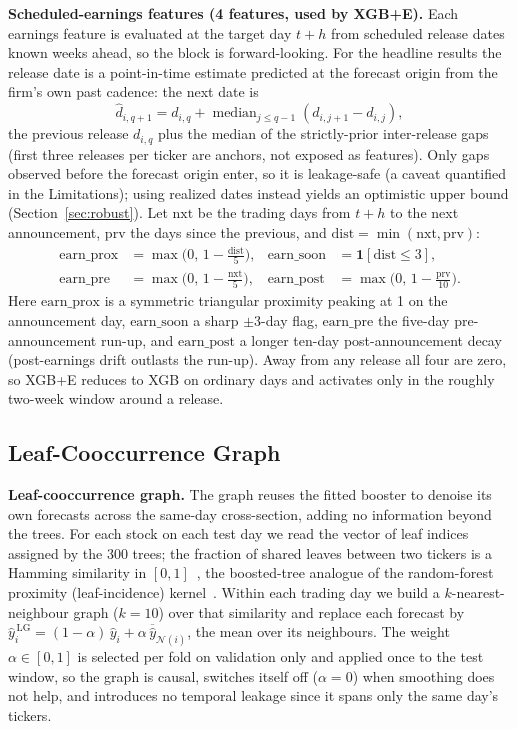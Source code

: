 \documentclass[runningheads]{llncs}
\begin{document}
\textbf{Scheduled-earnings features (4 features, used by XGB+E).} Each earnings feature is evaluated at the
target day $t+h$ from scheduled release dates known weeks ahead, so the block is forward-looking. For the
headline results the release date is a point-in-time estimate predicted at the forecast origin from the
firm's own past cadence: the next date is
\[ \hat d_{i,q+1} = d_{i,q} + \operatorname{median}_{j\le q-1}\left(d_{i,j+1}-d_{i,j}\right), \]
the previous release $d_{i,q}$ plus the median of the strictly-prior inter-release gaps (first three
releases per ticker are anchors, not exposed as features). Only gaps observed before the forecast origin
enter, so it is leakage-safe (a caveat quantified in the Limitations); using realized dates instead yields
an optimistic upper bound (Section~\ref{sec:robust}). Let $\mathrm{nxt}$ be the trading days from $t+h$ to
the next announcement, $\mathrm{prv}$ the days since the previous, and
$\mathrm{dist}=\min(\mathrm{nxt},\mathrm{prv})$:
\begin{align}
\mathrm{earn\_prox} &= \max\!\Big(0,\,1-\tfrac{\mathrm{dist}}{5}\Big), &
\mathrm{earn\_soon} &= \mathbf{1}[\mathrm{dist}\le 3],\\
\mathrm{earn\_pre} &= \max\!\Big(0,\,1-\tfrac{\mathrm{nxt}}{5}\Big), &
\mathrm{earn\_post} &= \max\!\Big(0,\,1-\tfrac{\mathrm{prv}}{10}\Big).
\end{align}
Here $\mathrm{earn\_prox}$ is a symmetric triangular proximity peaking at 1 on the announcement day,
$\mathrm{earn\_soon}$ a sharp $\pm 3$-day flag, $\mathrm{earn\_pre}$ the five-day pre-announcement run-up,
and $\mathrm{earn\_post}$ a longer ten-day post-announcement decay (post-earnings drift outlasts the
run-up). Away from any release all four are zero, so XGB+E reduces to XGB on ordinary days and activates
only in the roughly two-week window around a release.

\subsection{Leaf-Cooccurrence Graph}
\textbf{Leaf-cooccurrence graph.} The graph reuses the fitted booster to denoise its own forecasts across
the same-day cross-section, adding no information beyond the trees. For each stock on each test day we read
the vector of leaf indices assigned by the 300 trees; the fraction of shared leaves between two tickers is
a Hamming similarity in $[0,1]$~\cite{chen2016}, the boosted-tree analogue of the random-forest proximity
(leaf-incidence) kernel~\cite{rhodes2023}. Within each trading day we build a $k$-nearest-neighbour graph
($k=10$) over that similarity and replace each forecast by
$\hat y_i^{\,\mathrm{LG}}=(1-\alpha)\,\hat y_i+\alpha\,\overline{\hat y}_{\mathcal{N}(i)}$, the mean over
its neighbours. The weight $\alpha\in[0,1]$ is selected per fold on validation only and applied once to the
test window, so the graph is causal, switches itself off ($\alpha=0$) when smoothing does not help, and
introduces no temporal leakage since it spans only the same day's tickers.
\end{document}
